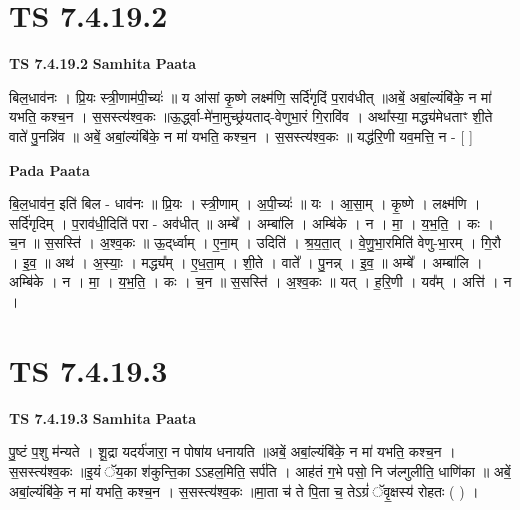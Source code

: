 \documentclass[17pt]{extarticle}
\begin{document}

\section{ TS 7.4.19.2 }

\textbf{TS 7.4.19.2 } \newline
\textbf{Samhita Paata} \newline

बिल॒धाव॑नः । प्रि॒यः स्त्री॒णाम॑पी॒च्यः॑ ॥ य आ॑सां कृ॒ष्णे लक्ष्म॑णि॒ सर्दि॑गृदिं प॒राव॑धीत् ॥अबें॒ अबां॒ल्यंबि॑के॒ न मा॑ यभति॒ कश्च॒न । स॒सस्त्य॑श्व॒कः ॥ऊ॒र्द्ध्वा-मे॑ना॒मुच्छ्र॑यताद्-वेणुभा॒रं गि॒रावि॑व । अथा᳚स्या॒ मद्ध्य॑मेधताꣳ शी॒ते वाते॑ पु॒नन्नि॑व ॥ अबें॒ अबां॒ल्यंबि॑के॒ न मा॑ यभति॒ कश्च॒न । स॒सस्त्य॑श्व॒कः ॥ यद्ध॑रि॒णी यव॒मत्ति॒ न - [  ] \newline

\textbf{Pada Paata} \newline

बि॒ल॒धाव॑न॒ इति॑ बिल - धाव॑नः ॥ प्रि॒यः । स्त्री॒णाम् । अ॒पी॒च्यः॑ ॥ यः । आ॒सा॒म् । कृ॒ष्णे । लक्ष्म॑णि । सर्दि॑गृदिम् । प॒राव॑धी॒दिति॑ परा - अव॑धीत् ॥ अम्बे᳚ । अम्बा॑लि । अम्बि॑के । न । मा॒ । य॒भ॒ति॒ । कः । च॒न ॥ स॒सस्ति॑ । अ॒श्व॒कः ॥ ऊ॒द्‌र्ध्वाम् । ए॒ना॒म् । उदिति॑ । श्र॒य॒ता॒त् । वे॒णु॒भा॒रमिति॑ वेणु-भा॒रम् । गि॒रौ । इ॒व॒ ॥ अथ॑ । अ॒स्याः॒ । मद्ध्य᳚म् । ए॒ध॒ता॒म् । शी॒ते । वाते᳚ । पु॒नन्न् । इ॒व॒ ॥ अम्बे᳚ । अम्बा॑लि । अम्बि॑के । न । मा॒ । य॒भ॒ति॒ । कः । च॒न ॥ स॒सस्ति॑ । अ॒श्व॒कः ॥ यत् । ह॒रि॒णी । यव᳚म् । अत्ति॑ । न ।  \newline





\section{ TS 7.4.19.3 }

\textbf{TS 7.4.19.3 } \newline
\textbf{Samhita Paata} \newline

पु॒ष्टं प॒शु म॑न्यते । शू॒द्रा यदर्य॑जारा॒ न पोषा॑य धनायति ॥अबें॒ अबां॒ल्यंबि॑के॒ न मा॑ यभति॒ कश्च॒न । स॒सस्त्य॑श्व॒कः ॥इ॒यं ॅय॒का श॑कुन्ति॒का ऽऽहल॒मिति॒ सर्प॑ति । आह॑तं ग॒भे पसो॒ नि ज॑ल्गुलीति॒ धाणि॑का ॥ अबें॒ अबां॒ल्यंबि॑के॒ न मा॑ यभति॒ कश्च॒न । स॒सस्त्य॑श्व॒कः ॥मा॒ता च॑ ते पि॒ता च॒ तेऽग्रं॑ ॅवृ॒क्षस्य॑ रोहतः ( ) । \newline
\end{document}
